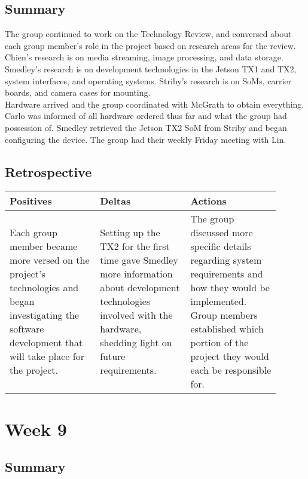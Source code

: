 \documentclass[letterpaper,10pt,serif,draftclsnofoot,onecolumn,compsoc,titlepage]{IEEEtran}
\begin{document}
\subsection{Summary}

The group continued to work on the Technology Review, and conversed about each group 
member's role in the project based on research areas for the review. Chien's research 
is on media streaming, image processing, and data storage. Smedley's research is on 
development technologies in the Jetson TX1 and TX2, system interfaces, and operating 
systems. Striby's research is on SoMs, carrier boards, and camera cases for mounting. \\

Hardware arrived and the group coordinated with McGrath to obtain everything. Carlo was 
informed of all hardware ordered thus far and what the group had possession of. Smedley 
retrieved the Jetson TX2 SoM from Striby and began configuring the device. The group 
had their weekly Friday meeting with Lin.\\

\subsection{Retrospective}

\begin{tabular}{|p{0.3\linewidth}|p{0.3\linewidth}|p{0.3\linewidth}|}
   \hline
   \textbf{Positives} & \textbf{Deltas} & \textbf{Actions}\\ 
   \hline
   Each group member became more versed on the project's technologies and 
   began investigating the software development that will take place for the project.  
   & 
   Setting up the TX2 for the first time gave Smedley more information about development technologies involved with the hardware, shedding light on future requirements. 
   & 
   The group discussed more specific details regarding system requirements and how they would be implemented. Group members established which portion of the project they would each be responsible for. 
   \\
   \hline
\end{tabular}

\section{Week 9}

\subsection{Summary}
\end{document}
